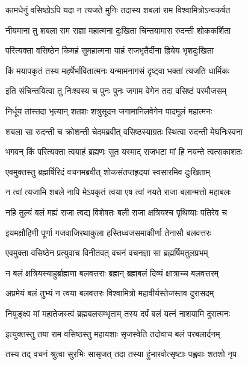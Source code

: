 
\twolineshloka
{कामधेनुं वसिष्ठोऽपि यदा न त्यजते मुनिः}
{तदास्य शबलां राम विश्वामित्रोऽन्वकर्षत} %

\twolineshloka
{नीयमाना तु शबला राम राज्ञा महात्मना}
{दुःखिता चिन्तयामास रुदन्ती शोककर्शिता} %

\twolineshloka
{परित्यक्ता वसिष्ठेन किमहं सुमहात्मना}
{याहं राजभृतैर्दीना ह्रियेय भृशदुःखिता} %

\twolineshloka
{किं मयापकृतं तस्य महर्षेर्भावितात्मनः}
{यन्मामनागसं दृष्ट्वा भक्तां त्यजति धार्मिकः} %

\twolineshloka
{इति संचिन्तयित्वा तु निःश्वस्य च पुनः पुनः}
{जगाम वेगेन तदा वसिष्ठं परमौजसम्} %

\twolineshloka
{निर्धूय तांस्तदा भृत्यान् शतशः शत्रुसूदन}
{जगामानिलवेगेन पादमूलं महात्मनः} %

\twolineshloka
{शबला सा रुदन्ती च क्रोशन्ती चेदमब्रवीत्}
{वसिष्ठस्याग्रतः स्थित्वा रुदन्ती मेघनिःस्वना} %

\twolineshloka
{भगवन् किं परित्यक्ता त्वयाहं ब्रह्मणः सुत}
{यस्माद् राजभटा मां हि नयन्ते त्वत्सकाशतः} %

\twolineshloka
{एवमुक्तस्तु ब्रह्मर्षिरिदं वचनमब्रवीत्}
{शोकसंतप्तहृदयां स्वसारमिव दुःखिताम्} %

\twolineshloka
{न त्वां त्यजामि शबले नापि मेऽपकृतं त्वया}
{एष त्वां नयते राजा बलान्मत्तो महाबलः} %

\twolineshloka
{नहि तुल्यं बलं मह्यं राजा त्वद्य विशेषतः}
{बली राजा क्षत्रियश्च पृथिव्याः पतिरेव च} %

\twolineshloka
{इयमक्षौहिणी पूर्णा गजवाजिरथाकुला}
{हस्तिध्वजसमाकीर्णा तेनासौ बलवत्तरः} %

\twolineshloka
{एवमुक्ता वसिष्ठेन प्रत्युवाच विनीतवत्}
{वचनं वचनज्ञा सा ब्रह्मर्षिमतुलप्रभम्} %

\twolineshloka
{न बलं क्षत्रियस्याहुर्ब्राह्मणा बलवत्तराः}
{ब्रह्मन् ब्रह्मबलं दिव्यं क्षात्राच्च बलवत्तरम्} %

\twolineshloka
{अप्रमेयं बलं तुभ्यं न त्वया बलवत्तरः}
{विश्वामित्रो महावीर्यस्तेजस्तव दुरासदम्} %

\twolineshloka
{नियुङ्क्ष्व मां महातेजस्त्वं ब्रह्मबलसम्भृताम्}
{तस्य दर्पं बलं यत्नं नाशयामि दुरात्मनः} %

\twolineshloka
{इत्युक्तस्तु तया राम वसिष्ठस्तु महायशाः}
{सृजस्वेति तदोवाच बलं परबलार्दनम्} %

\twolineshloka
{तस्य तद् वचनं श्रुत्वा सुरभिः सासृजत् तदा}
{तस्या हुंभारवोत्सृष्टाः पह्लवाः शतशो नृप} %


